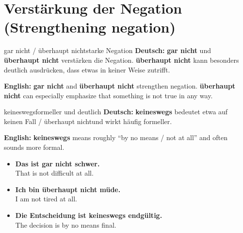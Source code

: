 \documentclass[a4paper,11pt]{article}
\newcommand{\GermanText}[1]{\textbf{Deutsch: }#1\par}
\newcommand{\EnglishText}[1]{{\small\color{SoftGray}\textbf{English: }#1\par}}
\newcommand{\ExampleItem}[2]{\item \textbf{#1}\\{\small\color{SoftGray}#2}}
\begin{document}
\section{Verstärkung der Negation \textnormal{(Strengthening negation)}}
\begin{grammarentry}{gar nicht / überhaupt nicht}{starke Negation}
\GermanText{\textbf{gar nicht} und \textbf{überhaupt nicht} verstärken die Negation. \textbf{überhaupt nicht} kann besonders deutlich ausdrücken, dass etwas in keiner Weise zutrifft.}
\EnglishText{\textbf{gar nicht} and \textbf{überhaupt nicht} strengthen negation. \textbf{überhaupt nicht} can especially emphasize that something is not true in any way.}
\end{grammarentry}
\begin{grammarentry}{keineswegs}{formeller und deutlich}
\GermanText{\textbf{keineswegs} bedeutet etwa \glqq auf keinen Fall / überhaupt nicht\grqq und wirkt häufig formeller.}
\EnglishText{\textbf{keineswegs} means roughly ``by no means / not at all'' and often sounds more formal.}
\end{grammarentry}
\begin{exbox}\begin{itemize}
\ExampleItem{Das ist gar nicht schwer.}{That is not difficult at all.}
\ExampleItem{Ich bin überhaupt nicht müde.}{I am not tired at all.}
\ExampleItem{Die Entscheidung ist keineswegs endgültig.}{The decision is by no means final.}
\end{itemize}\end{exbox}
\end{document}
